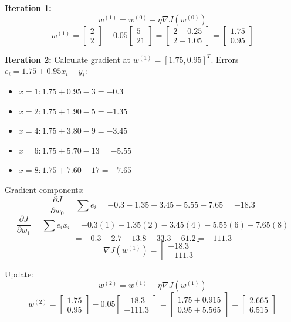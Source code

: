\documentclass{article}
\begin{document}
\textbf{Iteration 1:}
$$ w^{(1)} = w^{(0)} - \eta \nabla J(w^{(0)}) $$
$$ w^{(1)} = \begin{bmatrix} 2 \\ 2 \end{bmatrix} - 0.05 \begin{bmatrix} 5 \\ 21 \end{bmatrix} = \begin{bmatrix} 2 - 0.25 \\ 2 - 1.05 \end{bmatrix} = \begin{bmatrix} 1.75 \\ 0.95 \end{bmatrix} $$

\textbf{Iteration 2:}
Calculate gradient at $w^{(1)} = [1.75, 0.95]^T$.
Errors $e_i = 1.75 + 0.95 x_i - y_i$:
\begin{itemize}
    \item $x=1: 1.75 + 0.95 - 3 = -0.3$
    \item $x=2: 1.75 + 1.90 - 5 = -1.35$
    \item $x=4: 1.75 + 3.80 - 9 = -3.45$
    \item $x=6: 1.75 + 5.70 - 13 = -5.55$
    \item $x=8: 1.75 + 7.60 - 17 = -7.65$
\end{itemize}
Gradient components:
$$ \frac{\partial J}{\partial w_0} = \sum e_i = -0.3 - 1.35 - 3.45 - 5.55 - 7.65 = -18.3 $$
$$ \frac{\partial J}{\partial w_1} = \sum e_i x_i = -0.3(1) - 1.35(2) - 3.45(4) - 5.55(6) - 7.65(8) $$
$$ = -0.3 - 2.7 - 13.8 - 33.3 - 61.2 = -111.3 $$
$$ \nabla J(w^{(1)}) = \begin{bmatrix} -18.3 \\ -111.3 \end{bmatrix} $$

Update:
$$ w^{(2)} = w^{(1)} - \eta \nabla J(w^{(1)}) $$
$$ w^{(2)} = \begin{bmatrix} 1.75 \\ 0.95 \end{bmatrix} - 0.05 \begin{bmatrix} -18.3 \\ -111.3 \end{bmatrix} = \begin{bmatrix} 1.75 + 0.915 \\ 0.95 + 5.565 \end{bmatrix} = \begin{bmatrix} 2.665 \\ 6.515 \end{bmatrix} $$
\end{document}

